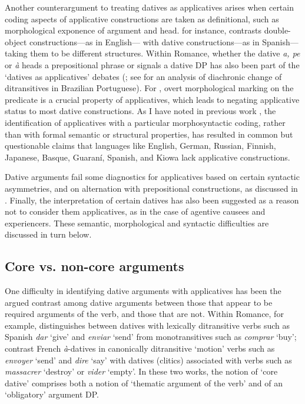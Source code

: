 \documentclass[output=paper,colorlinks,citecolor=brown,nonflat]{./langscibook}
\begin{document}
Another counterargument to treating datives as applicatives arises when certain coding aspects of applicative constructions are taken as definitional, such as morphological exponence of argument and head. \citet{Snyder1995} for instance, contrasts double-object constructions—as in English— with dative constructions—as in Spanish— taking them to be different structures. Within Romance, whether the dative \textit{a, pe} or \textit{à} heads a prepositional phrase or signals a dative DP has also been part of the ‘datives as applicatives’ debates (; see  for an analysis of diachronic change of ditransitives in Brazilian Portuguese). For \citet{Polinsky2013}, overt morphological marking on the predicate is a crucial property of applicatives, which leads to negating applicative status to most dative constructions. As I have noted in previous work \citep[131]{Cuervo2015Chapter}, the identification of applicatives with a particular morphosyntactic coding, rather than with formal semantic or structural properties, has resulted in common but questionable claims that languages like English, German, Russian, Finnish, Japanese, Basque, Guaraní, Spanish, and Kiowa lack applicative constructions.

Dative arguments fail some diagnostics for applicatives based on certain syntactic asymmetries, and on alternation with prepositional constructions, as discussed in . Finally, the interpretation of certain datives has also been suggested as a reason not to consider them applicatives, as in the case of agentive causees \citep{Tubino2012} and experiencers.  These semantic, morphological and syntactic difficulties are discussed in turn below.

\subsection{Core vs. non-core arguments}\label{sec:cuervo:2.1}

One difficulty in identifying dative arguments with applicatives has been the argued contrast among dative arguments between those that appear to be required arguments of the verb, and those that are not. Within Romance, for example, \citet{Pujalte2009} distinguishes between datives with lexically ditransitive verbs such as Spanish \textit{dar} ‘give’ and \textit{enviar} ‘send’ from monotransitives such as \textit{comprar} ‘buy’; \citet{BonehNash2012} contrast French \textit{à}-datives in canonically ditransitive ‘motion’ verbs such as \textit{envoyer} ‘send’ and \textit{dire} ‘say’ with datives (clitics) associated with verbs such as \textit{massacrer} ‘destroy’ or \textit{vider} ‘empty’. In these two works, the notion of ‘core dative’ comprises both a notion of ‘thematic argument of the verb’ and of an ‘obligatory’ argument DP.
\end{document}
